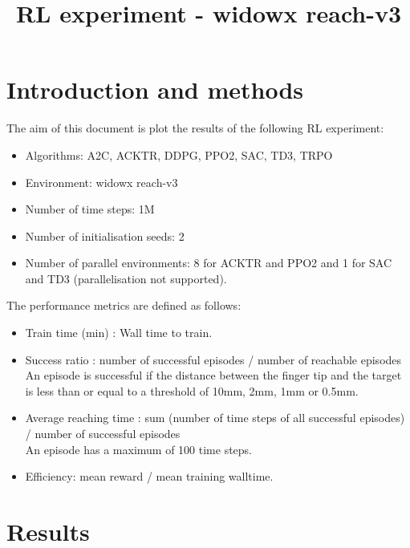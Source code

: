\documentclass{article}
\title{RL experiment - widowx reach-v3}
\date{}
\begin{document}
\maketitle





\section{Introduction and methods}


The aim of this document is plot the results of the following RL experiment:

\begin{itemize}
  \item Algorithms: A2C, ACKTR, DDPG, PPO2, SAC, TD3, TRPO 
  \item Environment: widowx reach-v3
  \item Number of time steps: 1M
  \item Number of initialisation seeds: 2
  \item Number of parallel environments: 8 for ACKTR and PPO2 and 1 for SAC and TD3 (parallelisation not supported).
\end{itemize}


The performance metrics are defined as follows:

\begin{itemize}
  \item Train time (min) : Wall time to train.
  \item Success ratio : number of successful episodes / number of reachable episodes \\ 
An episode is successful if the distance between the finger tip and the target is less than or equal to a threshold of 10mm, 2mm, 1mm or 0.5mm. \\ 
  \item Average reaching time : sum (number of time steps of all successful episodes) /  number of successful episodes \\ 
An episode has a maximum of 100 time steps.
  \item Efficiency: mean reward / mean training walltime. 
\end{itemize}



\section{Results}
\end{document}
